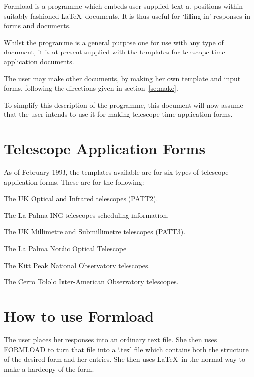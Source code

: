 Formload is a programme which embeds user supplied text at positions within
suitably fashioned \LaTeX\ documents. It is thus useful for `filling in'
responses in forms and documents. 

Whilst the programme is a general purpose one for use with any type of
document, it is at present supplied with the templates for telescope time
application documents. 

The user may make other documents, by making her own template and input
forms, following the directions given in section~\ref{se:make}. 

To simplify this description of the programme, this document will now
assume that the user intends to use it for making telescope time
application forms. 


\section{Telescope Application Forms}

As of February 1993, the templates available are for six types of telescope
application forms. These are for the following:- 

\begin{list}{{--}}{}

\item The UK Optical and Infrared telescopes (PATT2).
\item The La Palma ING telescopes scheduling information.
\item The UK Millimetre and Submillimetre telescopes (PATT3).
\item The La Palma Nordic Optical Telescope.
\item The Kitt Peak National Observatory telescopes.
\item The Cerro Tololo Inter-American Observatory telescopes.

\end{list}

\eject

\tableofcontents

\section{How to use Formload}
\label{se:use}

The user places her responses into an ordinary text file. She then uses
FORMLOAD to turn that file into a `.tex' file which contains both the
structure of the desired form and her entries. She then uses \LaTeX\ in the
normal way to make a hardcopy of the form. 

